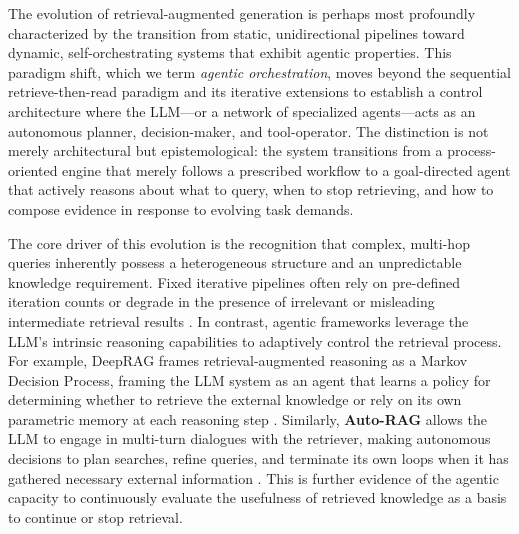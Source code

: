 \documentclass[11pt,a4paper]{article}
\begin{document}
The evolution of retrieval-augmented generation is perhaps most profoundly characterized by the transition from static, unidirectional pipelines toward dynamic, self-orchestrating systems that exhibit agentic properties. This paradigm shift, which we term \emph{agentic orchestration}, moves beyond the sequential retrieve-then-read paradigm and its iterative extensions to establish a control architecture where the LLM---or a network of specialized agents---acts as an autonomous planner, decision-maker, and tool-operator. The distinction is not merely architectural but epistemological: the system transitions from a process-oriented engine that merely follows a prescribed workflow to a goal-directed agent that actively reasons about what to query, when to stop retrieving, and how to compose evidence in response to evolving task demands.

The core driver of this evolution is the recognition that complex, multi-hop queries inherently possess a heterogeneous structure and an unpredictable knowledge requirement. Fixed iterative pipelines often rely on pre-defined iteration counts or degrade in the presence of irrelevant or misleading intermediate retrieval results \cite{arxiv:2404.14464v1,arxiv:2601.11255v1,arxiv:2502.01142v2}. In contrast, agentic frameworks leverage the LLM's intrinsic reasoning capabilities to adaptively control the retrieval process. For example, DeepRAG frames retrieval-augmented reasoning as a Markov Decision Process, framing the LLM system as an agent that learns a policy for determining whether to retrieve the external knowledge or rely on its own parametric memory at each reasoning step \cite{arxiv:2502.01142v2}. Similarly, \textbf{Auto-RAG} allows the LLM to engage in multi-turn dialogues with the retriever, making autonomous decisions to plan searches, refine queries, and terminate its own loops when it has gathered necessary external information \cite{arxiv:2411.19443v1}. This is further evidence of the agentic capacity to continuously evaluate the usefulness of retrieved knowledge as a basis to continue or stop retrieval.
\end{document}
